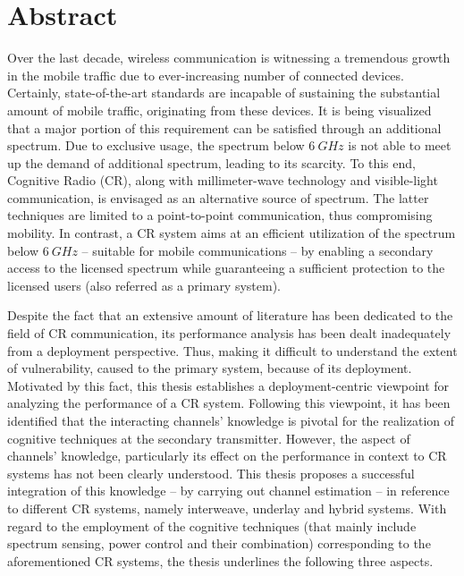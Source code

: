 
\chapter*{Abstract}
Over the last decade, wireless communication is witnessing a tremendous growth in the mobile traffic due to ever-increasing number of connected devices. Certainly, state-of-the-art standards are incapable of sustaining the substantial amount of mobile traffic, originating from these devices. It is being visualized that a major portion of this requirement can be satisfied through an additional spectrum. Due to exclusive usage, the spectrum below $\SI{6}{GHz}$ is not able to meet up the demand of additional spectrum, leading to its scarcity. To this end, Cognitive Radio (CR), along with millimeter-wave technology and visible-light communication, is envisaged as an alternative source of spectrum. The latter techniques are limited to a point-to-point communication, thus compromising mobility. In contrast, a CR system aims at an efficient utilization of the spectrum below $\SI{6}{GHz}$ -- suitable for mobile communications -- by enabling a secondary access to the licensed spectrum while guaranteeing a sufficient protection to the licensed users (also referred as a primary system). %


Despite the fact that an extensive amount of literature has been dedicated to the field of CR communication, its performance analysis has been dealt inadequately from a deployment perspective. Thus, making it difficult to understand the extent of vulnerability, caused to the primary system, because of its deployment. Motivated by this fact, this thesis establishes a deployment-centric viewpoint for analyzing the performance of a CR system. Following this viewpoint, it has been identified that the interacting channels' knowledge is pivotal for the realization of cognitive techniques at the secondary transmitter. However, the aspect of channels' knowledge, particularly its effect on the performance in context to CR systems has not been clearly understood. This thesis proposes a successful integration of this knowledge -- by carrying out channel estimation -- in reference to different CR systems, namely interweave, underlay and hybrid systems. With regard to the employment of the cognitive techniques (that mainly include spectrum sensing, power control and their combination) corresponding to the aforementioned CR systems, the thesis underlines the following three aspects. 

